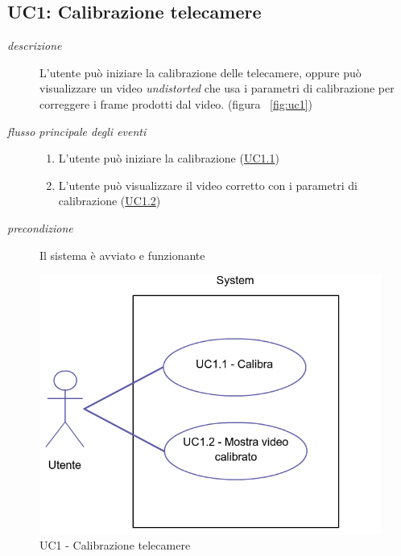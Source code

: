 \subsection{UC1: Calibrazione telecamere} \label{sec:UC1}
\begin{description}
\item[\em{descrizione }]L'utente può iniziare la calibrazione delle telecamere, oppure può visualizzare un video \textit{undistorted} che usa i parametri di calibrazione per correggere i frame prodotti dal video. (figura ~\ref{fig:uc1})
\item[\em{flusso principale degli eventi }] \mbox{}
\begin{enumerate}
\item L'utente può iniziare la calibrazione (\hyperref[sec:uc1.1]{UC1.1}) 
\item L'utente può visualizzare il video corretto con i parametri di calibrazione (\hyperref[sec:uc1.2]{UC1.2})
\end{enumerate}
\item[\em{precondizione }] Il sistema è avviato e funzionante
\end{description}

\begin{figure}[htpb] 
\centering 
\includegraphics[scale=0.4]{./images/uc1.png} 
\caption{UC1 - Calibrazione telecamere} 
\label{fig:UC1}
\end{figure} 

